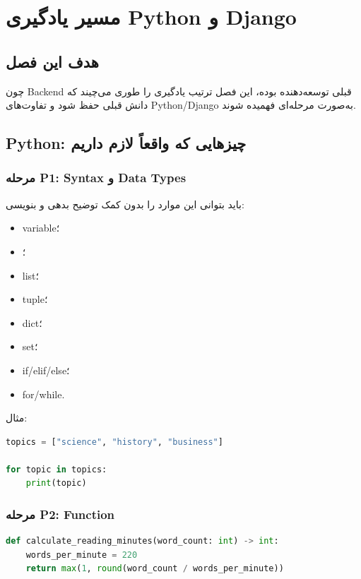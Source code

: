
\chapter{مسیر یادگیری Python و Django}

\section{هدف این فصل}

چون Backend قبلی توسعه‌دهنده  بوده، این فصل ترتیب یادگیری را طوری می‌چیند که دانش قبلی حفظ شود و تفاوت‌های Python/Django به‌صورت مرحله‌ای فهمیده شوند.

\section{Python: چیزهایی که واقعاً لازم داریم}

\subsection{مرحله P1: Syntax و Data Types}

باید بتوانی این موارد را بدون کمک توضیح بدهی و بنویسی:
\begin{itemize}
  \item variable؛
  \item {}؛
  \item list؛
  \item tuple؛
  \item dict؛
  \item set؛
  \item if/elif/else؛
  \item for/while.
\end{itemize}

مثال:
\begin{latin}
\begin{lstlisting}[language=Python]
topics = ["science", "history", "business"]

for topic in topics:
    print(topic)
\end{lstlisting}
\end{latin}

\subsection{مرحله P2: Function}

\begin{latin}
\begin{lstlisting}[language=Python]
def calculate_reading_minutes(word_count: int) -> int:
    words_per_minute = 220
    return max(1, round(word_count / words_per_minute))
\end{lstlisting}
\end{latin}

